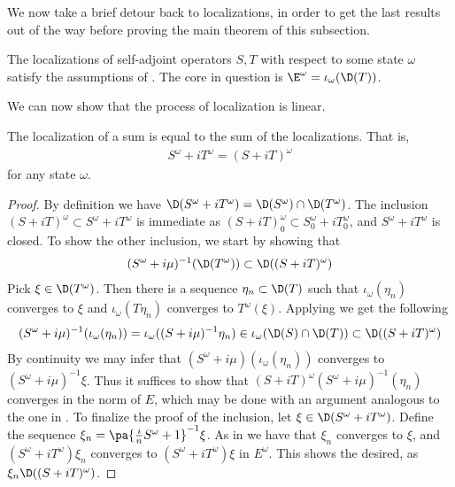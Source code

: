 We now take a brief detour back to localizations, in order to get the last results out of the way before proving the main theorem of this subsection. 

\begin{lemma}
	The localizations of self-adjoint operators $S,T$ with respect to some state $\omega$ satisfy the assumptions of . The core in question is $\E^\omega=\iota_\omega(\D(T))$. 
\end{lemma}

We can now show that the process of localization is linear. 
\begin{lemma}
	The localization of a sum is equal to the sum of the localizations. That is, 
	\begin{align*}
		S^\omega+iT^\omega=(S+iT)^\omega
	\end{align*}
	for any state $\omega$. 
\end{lemma}
\begin{proof}
	By definition we have $\D(S^\omega+iT^\omega)=\D(S^\omega)\cap \D(T^\omega)$. The inclusion $(S+iT)^\omega\subset S^\omega+iT^\omega$  is immediate as $(S+iT)_0^\omega\subset S_0^\omega+iT_0^\omega$, and $S^\omega+iT^\omega$ is closed. To show the other inclusion, we start by showing that 
\begin{align*}
	(S^\omega+i\mu)^{-1}(\D(T^\omega))\subset \D((S+iT)^\omega)
\end{align*}
	Pick $\xi \in \D(T^\omega)$. Then there is a sequence $\eta_n\subset \D(T)$ such that $\iota_\omega(\eta_n)$ converges to $\xi$ and $\iota_{\omega}(T\eta_n)$ converges to $T^\omega(\xi)$. Applying  we get the following
	\begin{align*}
		(S^\omega+i\mu)^{-1}(\iota_\omega(\eta_n))=\iota_\omega((S+i\mu)^{-1}\eta_n)\in \iota_\omega(\D(S)\cap \D(T))\subset \D((S+iT)^\omega)
	\end{align*}
	By continuity we may infer that $(S^\omega+i\mu)(\iota_\omega(\eta_n))$ converges to $(S^\omega+i\mu)^{-1}\xi$. Thus it suffices to show that $(S+iT)^\omega(S^\omega+i\mu)^{-1}(\eta_n)$ converges in the norm of $E$, which may be done with an argument analogous to the one in . To finalize the proof of the inclusion, let $\xi\in \D(S^\omega+iT^\omega)$. Define the sequence $\xi_n=\pa{\frac{i}{n}S^\omega+1}^{-1}\xi$. As in  we have that $\xi_n$ converges to $\xi$, and $(S^\omega+iT^\omega)\xi_n$ converges to $(S^\omega+iT^\omega)\xi$ in $E^\omega$. This shows the desired, as $\xi_n\D((S+iT)^{\omega})$. 
\end{proof}
